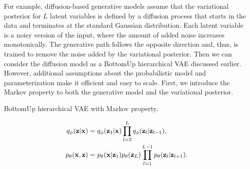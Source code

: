 For example, diffusion-based generative models assume that the variational posterior for $L$ latent variables is defined by a diffusion process that starts in the data and terminates at the standard Gaussian distribution. 
Each latent variable is a noisy version of the input, where the amount of added noise increases monotonically. 
The generative path follows the opposite direction and, thus, is trained to remove the noise added by the variational posterior. 
Then we can consider the diffusion model as a BottomUp hierarchical VAE discussed earlier. 
However, additional assumptions about the probabilistic model and parameterization make it efficient and easy to scale. 
First, we introduce the Markov property to both the generative model and the variational posterior.
\begin{marginfigure}
\quad\quad
  \quad\quad\quad
\caption{BottomUp hierarchical VAE with Markov property.}\label{fig:intro_diff_schema}
\end{marginfigure}
\begin{align}
    q_{\phi}({\mathbf{z}}|{\mathbf{x}}) &= q_{\phi}({\mathbf{z}}_1|{\mathbf{x}})\prod_{l=2}^L q_{\phi}({\mathbf{z}}_l|{\mathbf{z}}_{l-1}), \\
    p_{\theta}({\mathbf{x}}, {\mathbf{z}}) &= p_{\theta}({\mathbf{x}} |{\mathbf{z}}_1) p_{\theta}({\mathbf{z}}_L)\prod_{l=1}^{L-1} p_{\theta}({\mathbf{z}}_l|{\mathbf{z}}_{l+1}).
\end{align}
